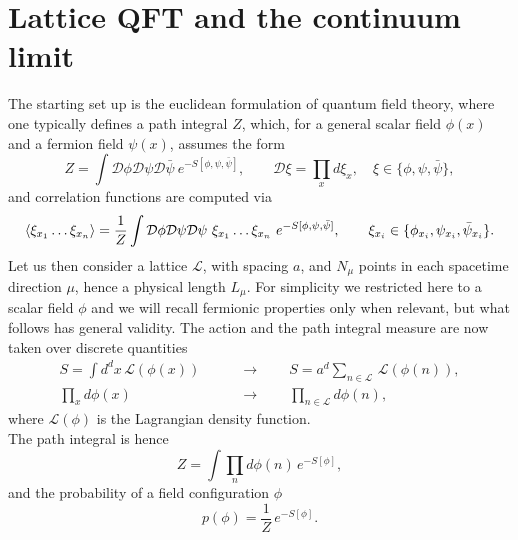 \section{Lattice QFT and the continuum limit}
\label{sec:lattice_continuum_}
The starting set up is the euclidean formulation of quantum field theory, where one typically defines a path integral $Z$, which, for a general scalar field $\phi(x)$ and a fermion field $\psi(x)$, assumes the form
\begin{equation}
    Z = \int \mathcal{D}\phi\mathcal{D}\psi\mathcal{D}\bar\psi \ e^{-S[\phi, \psi, \bar\psi]}, \qquad \mathcal{D}\xi = \prod_x d\xi_x, \quad \xi \in \{\phi, \psi, \bar\psi\},
    \label{eq:path_integral_generic}
\end{equation}
and correlation functions are computed via
\begin{equation*}
        \left\langle \xi_{x_1} \dots \xi_{x_n}  \right\rangle = \frac{1}{Z} \int \mathcal{D}\phi\mathcal{D}\psi\mathcal{D}\psi \ \xi_{x_1} \dots \xi_{x_n} \ e^{-S[\phi, \psi, \bar\psi]}, \qquad \xi_{x_i} \in \{\phi_{x_i}, \psi_{x_i}, \bar\psi_{x_i}\}. \\
\end{equation*}
Let us then consider a lattice $\mathscr{L}$, with spacing $a$, and $N_\mu$ points in each spacetime direction $\mu$, hence a physical length $L_\mu$.
For simplicity we restricted here to a scalar field $\phi$ and we will recall fermionic properties only when relevant, but what follows has general validity. 
The action and the path integral measure are now taken over discrete quantities 
\begin{equation*}
    \begin{aligned}
	    S = \int d^dx \, \mathcal{L}(\phi(x)) \qquad &\to \qquad S = a^d \sum_{n \in \mathscr{L}} \, \mathcal{L}(\phi(n)), \\
        \prod_{x} d\phi(x) \qquad &\to  \qquad \prod_{n \in \mathscr{L}} d\phi(n),
    \end{aligned}
\end{equation*}
where $\mathcal{L}(\phi)$ is the Lagrangian density function.  \\
The path integral is hence
\begin{equation*}
    Z = \int \prod_n d\phi(n) \, e^{-S[\phi]},
\end{equation*}
and the probability of a field configuration $\phi$
\begin{equation}
    p(\phi) = \frac{1}{Z} \, e^{-S[\phi]}.
    \label{eq:probability_distribution_lattice}
\end{equation}
